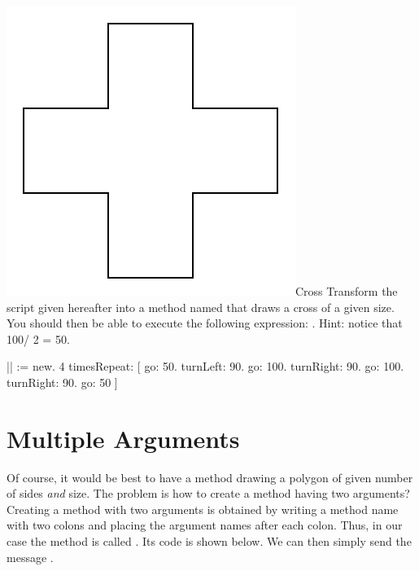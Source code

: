 \begin{exofigwithsizeandtitle}[0.5]{\includegraphics{Argcrossscr}}{Cross}
Transform the script given hereafter into a method named  that draws a cross of a given size. You should then be able to execute the following expression: . Hint: notice that 100/ 2 = 50.
\begin{nalltt}
|\caro|
\caro := \Turtle new.
4 timesRepeat: 
               [ \caro go: 50. 
               \caro turnLeft: 90. 
               \caro go: 100. 
               \caro turnRight: 90. 
               \caro go: 100.
               \caro turnRight: 90.
               \caro go: 50 ]

\end{nalltt}
\end{exofigwithsizeandtitle}



\section{Multiple Arguments}
Of course, it would be best to have a method drawing a polygon of given number of sides
\emph{and} size. The problem is how to create a method having two arguments?Creating a method with two arguments is obtained by writing a method name with two colons and placing the argument names after each colon.
Thus, in our case the method is called . Its code is shown below. We can then simply send the message .

